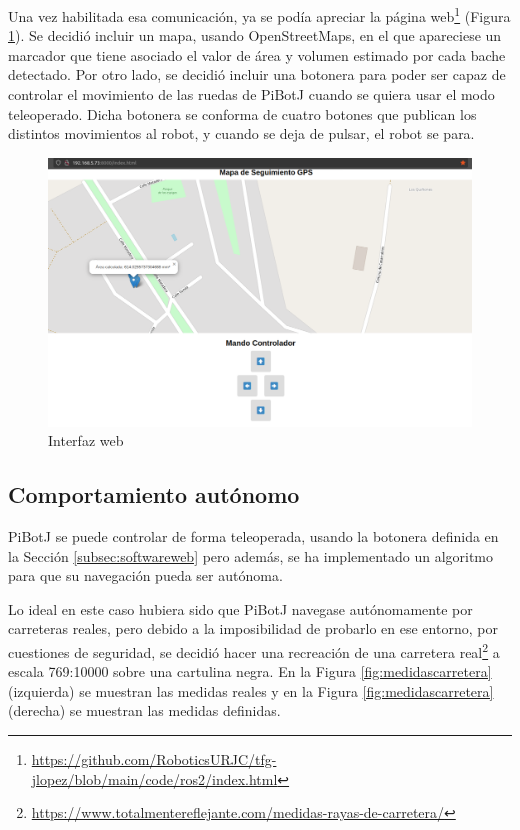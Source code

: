Una vez habilitada esa comunicación, ya se podía apreciar la página web\footnote{\url{https://github.com/RoboticsURJC/tfg-jlopez/blob/main/code/ros2/index.html}} (Figura \ref{fig:interfazweb}). Se decidió incluir un mapa, usando OpenStreetMaps, en el que apareciese un marcador que tiene asociado el valor de área y volumen estimado por cada bache detectado. Por otro lado, se decidió incluir una botonera para poder ser capaz de controlar el movimiento de las ruedas de PiBotJ cuando se quiera usar el modo teleoperado. Dicha botonera se conforma de cuatro botones que publican los distintos movimientos al robot, y cuando se deja de pulsar, el robot se para.


\begin{figure} [h!]
	\begin{center}
		\includegraphics[width=12cm]{figs/cap6/interfazweb.png}
	\end{center}
	\caption{Interfaz web}
	\label{fig:interfazweb}
\end{figure}


\subsection{Comportamiento autónomo}
\label{subsec:autonomo}
PiBotJ se puede controlar de forma teleoperada, usando la botonera definida en la Sección \ref{subsec:softwareweb} pero además, se ha implementado un algoritmo para que su navegación pueda ser autónoma.

Lo ideal en este caso hubiera sido que PiBotJ navegase autónomamente por carreteras reales, pero debido a la imposibilidad de probarlo en ese entorno, por cuestiones de seguridad, se decidió hacer una recreación de una carretera real\footnote{\url{https://www.totalmentereflejante.com/medidas-rayas-de-carretera/}} a escala 769:10000 sobre una cartulina negra. En la Figura \ref{fig:medidascarretera} (izquierda) se muestran las medidas reales y en la Figura \ref{fig:medidascarretera} (derecha) se muestran las medidas definidas. 

